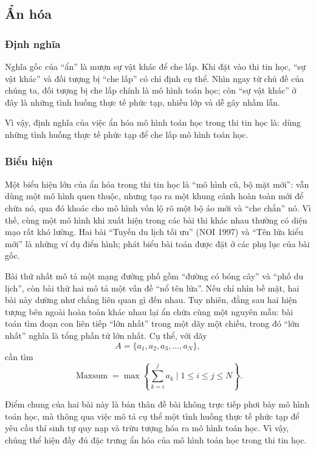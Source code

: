 \documentclass[11pt]{article}
\begin{document}
\subsection{Ẩn hóa}

\subsubsection{Định nghĩa}

Nghĩa gốc của ``ẩn'' là mượn sự vật khác để che lấp. Khi đặt vào thi tin học,
``sự vật khác'' và đối tượng bị ``che lấp'' có chỉ định cụ thể. Nhìn ngay từ
chủ đề của chúng ta, đối tượng bị che lấp chính là mô hình toán học; còn
``sự vật khác'' ở đây là những tình huống thực tế phức tạp, nhiều lớp và dễ
gây nhầm lẫn.

Vì vậy, định nghĩa của việc ẩn hóa mô hình toán học trong thi tin học là:
dùng những tình huống thực tế phức tạp để che lấp mô hình toán học.

\subsubsection{Biểu hiện}

Một biểu hiện lớn của ẩn hóa trong thi tin học là ``mô hình cũ, bộ mặt mới'':
vẫn dùng một mô hình quen thuộc, nhưng tạo ra một khung cảnh hoàn toàn mới
để chứa nó, qua đó khoác cho mô hình vốn lộ rõ một bộ áo mới và ``che chắn''
nó. Vì thế, cùng một mô hình khi xuất hiện trong các bài thi khác nhau thường
có diện mạo rất khó lường. Hai bài ``Tuyến du lịch tối ưu'' (NOI 1997) và
``Tên lửa kiểu mới'' là những ví dụ điển hình; phát biểu bài toán được đặt ở
các phụ lục của bài gốc.

Bài thứ nhất mô tả một mạng đường phố gồm ``đường có bóng cây'' và ``phố du
lịch'', còn bài thứ hai mô tả một vấn đề ``nổ tên lửa''. Nếu chỉ nhìn bề mặt,
hai bài này dường như chẳng liên quan gì đến nhau. Tuy nhiên, đằng sau hai
hiện tượng bên ngoài hoàn toàn khác nhau lại ẩn chứa cùng một nguyên mẫu:
bài toán tìm đoạn con liên tiếp ``lớn nhất'' trong một dãy một chiều, trong
đó ``lớn nhất'' nghĩa là tổng phần tử lớn nhất. Cụ thể, với dãy
\[
  A=\{a_1,a_2,a_3,\ldots,a_N\},
\]
cần tìm
\[
  \operatorname{Maxsum}
    =\max\left\{\sum_{k=i}^{j} a_k \mid 1\le i\le j\le N\right\}.
\]

Điểm chung của hai bài này là bản thân đề bài không trực tiếp phơi bày mô
hình toán học, mà thông qua việc mô tả cụ thể một tình huống thực tế phức tạp
để yêu cầu thí sinh tự quy nạp và trừu tượng hóa ra mô hình toán học. Vì vậy,
chúng thể hiện đầy đủ đặc trưng ẩn hóa của mô hình toán học trong thi tin
học.
\end{document}
